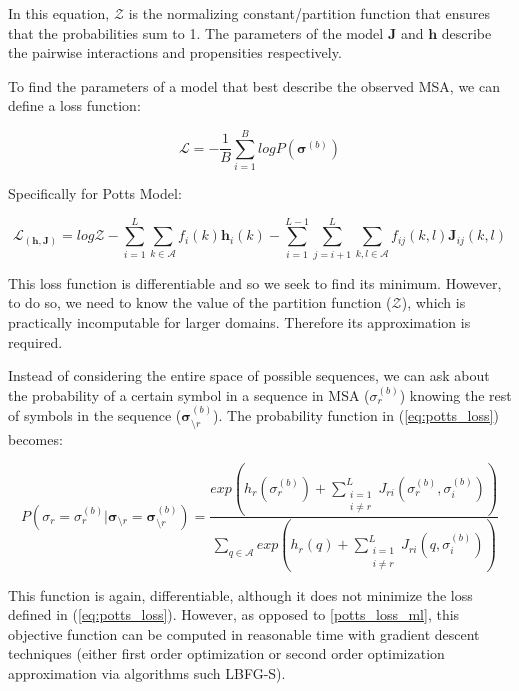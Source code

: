 In this equation, $\mathcal{Z}$ is the normalizing constant/partition function that ensures that the probabilities sum to 1. 
The parameters of the model $\bm{J}$ and $\bm{h}$ describe the pairwise interactions and propensities respectively.
        
To find the parameters of a model that best describe the observed MSA, we can define a loss function:
        
\begin{equation}
    \mathcal{L} = -\frac{1}{B} \sum_{i=1}^B logP(\bm{\sigma}^{(b)})
    \label{eq:potts_loss}
\end{equation}
        
Specifically for Potts Model: 
        
\begin{equation}
    \mathcal{L}_(\bm{h}, \bm{J}) = log \mathcal{Z} - \sum_{i = 1}^L \sum_{k \in \mathcal{A}} f_i(k)\bm{h}_i(k) - \sum_{i = 1}^{L-1} \sum_{j=i+1}^L \sum_{k, l \in \mathcal{A}} f_{ij}(k, l) \bm{J}_{ij}(k, l)
    \label{potts_loss_ml}
\end{equation}
        
This loss function is differentiable and so we seek to find its minimum. 
However, to do so, we need to know the value of the partition function ($\mathcal{Z}$), which is practically incomputable for larger domains. 
Therefore its approximation is required.
        
Instead of considering the entire space of possible sequences, we can ask about the probability of a certain symbol in a sequence in MSA ($\sigma_r^{(b)}$) knowing the rest of symbols in the sequence ($\bm{\sigma}_{\setminus r}^{(b)}$). 
The probability function in (\ref{eq:potts_loss}) becomes:
        
$$
P(\sigma_{r} = \sigma_r^{(b)} | \bm{\sigma}_{\setminus r} = \bm{\sigma}_{\setminus r}^{(b)}) = \frac{exp \left(h_r (\sigma_r^{(b)}) + \sum_{\substack{i = 1\\i\neq r}}^L J_{ri}(\sigma_r^{(b)}, \sigma_i^{(b)})\right)}{\sum_{q \in \mathcal{A}} exp \left(h_r(q) + \sum_{\substack{i = 1\\i\neq r}}^L J_{ri}(q, \sigma_i^{(b)})\right)}$$
        
This function is again, differentiable, although it does not minimize the loss defined in (\ref{eq:potts_loss}).
However, as opposed to \ref{potts_loss_ml}, this objective function can be computed in reasonable time with gradient descent techniques (either first order optimization or second order optimization approximation via algorithms such LBFG-S)\cite{potts1, potts2}.
        
